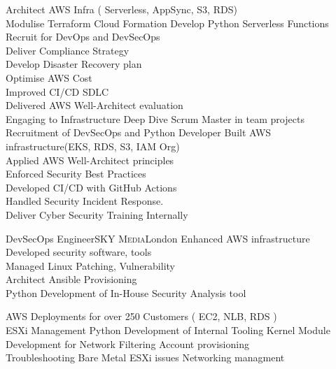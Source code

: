 \documentclass[10pt,a4paper,sans]{moderncv} %
\begin{document}
{
	Architect AWS Infra ( Serverless, AppSync, S3, RDS) \\
	Modulise Terraform Cloud Formation
	Develop Python Serverless Functions \\
	Recruit for DevOps and DevSecOps \\
	Deliver Compliance Strategy\\
	Develop Disaster Recovery plan\\
	Optimise AWS Cost \\
	Improved CI/CD SDLC \\
	Delivered AWS Well-Architect evaluation\\
	Engaging to Infrastructure Deep Dive
}
{
	Scrum Master in team projects\\
	Recruitment of DevSecOps and Python Developer
	Built AWS infrastructure(EKS, RDS, S3, IAM Org) \\
	Applied AWS Well-Architect principles \\
	Enforced Security Best Practices\\
	Developed CI/CD with GitHub Actions\\
	Handled Security Incident Response.\\
	Deliver Cyber Security Training Internally\\
}

 {DevSecOps Engineer}{\textsc{SKY Media}}{London}{}
{
	Enhanced AWS infrastructure \\
	Developed security software, tools \\
	Managed Linux Patching, Vulnerability \\
	Architect Ansible Provisioning \\
	Python Development of In-House Security Analysis tool
}

{
	AWS Deployments for over 250 Customers ( EC2, NLB, RDS )\\
	ESXi Management
	Python Development of Internal Tooling
	Kernel Module Development for Network Filtering
}
{
	Account provisioning\\
	Troubleshooting Bare Metal ESXi issues
	Networking managment
}

\end{document}
